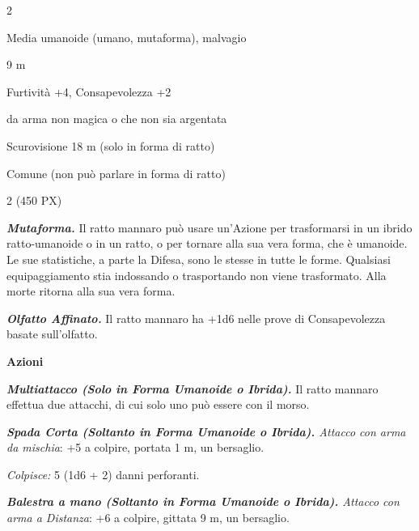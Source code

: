 \begin{multicols}{2}
{
\begin{description}[noitemsep, topsep=0pt, parsep=0pt, partopsep=0pt, itemsep=1pt, leftmargin=2.35cm,  labelwidth=2.2cm, itemindent=0cm, listparindent=0pt] %
\setlength{\baselineskip}{10pt}
\item[\textbf{Taglia/Tipo}] Media umanoide (umano, mutaforma), malvagio
\item[\textbf{Caratt.}] 
\item[\textbf{Punti Ferita}] 
\item[\textbf{Movimento}] 9 m
\item[\textbf{Tiri Salvez.}] 
\item[\textbf{Comp.}] Furtività +4, Consapevolezza +2
\item[\textbf{Imm. Danni}] da arma non magica o che non sia argentata
\item[\textbf{Sensi}] Scurovisione 18 m (solo in forma di ratto)
\item[\textbf{Linguaggi}] Comune (non può parlare in forma di ratto)
\item[\textbf{Sfida}] 2 (450 PX)
\end{description}
\smallskip

\emph{\textbf{Mutaforma.}} Il ratto mannaro può usare un'Azione per trasformarsi in un ibrido ratto-umanoide o in un ratto, o per tornare alla sua vera forma, che è umanoide. Le sue statistiche, a parte la Difesa, sono le stesse in tutte le forme. Qualsiasi equipaggiamento stia indossando o trasportando non viene trasformato. Alla morte ritorna alla sua vera forma.

\emph{\textbf{Olfatto Affinato.}} Il ratto mannaro ha +1d6 nelle prove di Consapevolezza basate sull'olfatto.

\textbf{Azioni}

\emph{\textbf{Multiattacco (Solo in Forma Umanoide o Ibrida).}} Il ratto mannaro effettua due attacchi, di cui solo uno può essere con il morso.

\emph{\textbf{Spada Corta (Soltanto in Forma Umanoide o Ibrida).} Attacco con arma da mischia}: +5 a colpire, portata 1 m, un bersaglio.

\emph{Colpisce:} 5 (1d6 + 2) danni perforanti.

\emph{\textbf{Balestra a mano (Soltanto in Forma Umanoide o Ibrida).} Attacco con arma a Distanza}: +6 a colpire, gittata 9 m, un bersaglio.

}
\end{multicols}
